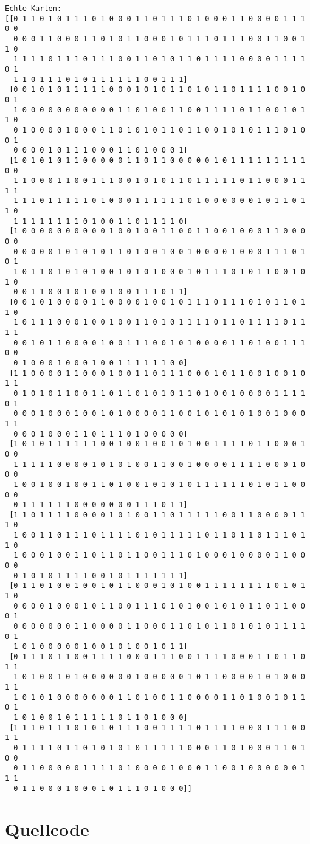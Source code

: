 \documentclass[a4paper,10pt,ngerman]{scrartcl}
\begin{document}
\begin{lstlisting}
Echte Karten: 
[[0 1 1 0 1 0 1 1 1 0 1 0 0 0 1 1 0 1 1 1 0 1 0 0 0 1 1 0 0 0 0 1 1 1 0 0
  0 0 0 1 1 0 0 0 1 1 0 1 0 1 1 0 0 0 1 0 1 1 1 0 1 1 1 0 0 1 1 0 0 1 1 0
  1 1 1 1 0 1 1 1 0 1 1 1 0 0 1 1 0 1 0 1 1 0 1 1 1 1 0 0 0 0 1 1 1 1 0 1
  1 1 0 1 1 1 0 1 0 1 1 1 1 1 1 0 0 1 1 1]
 [0 0 1 0 1 0 1 1 1 1 1 0 0 0 1 0 1 0 1 1 0 1 0 1 1 0 1 1 1 1 0 0 1 0 0 1
  1 0 0 0 0 0 0 0 0 0 0 0 1 1 0 1 0 0 1 1 0 0 1 1 1 1 0 1 1 0 0 1 0 1 1 0
  0 1 0 0 0 0 1 0 0 0 1 1 0 1 0 1 0 1 1 0 1 1 0 0 1 0 1 0 1 1 1 0 1 0 0 1
  0 0 0 0 1 0 1 1 1 0 0 0 1 1 0 1 0 0 0 1]
 [1 0 1 0 1 0 1 1 0 0 0 0 0 1 1 0 1 1 0 0 0 0 0 1 0 1 1 1 1 1 1 1 1 1 0 0
  1 1 0 0 0 1 1 0 0 1 1 1 0 0 1 0 1 0 1 1 0 1 1 1 1 1 0 1 1 0 0 0 1 1 1 1
  1 1 1 0 1 1 1 1 1 0 1 0 0 0 1 1 1 1 1 1 0 1 0 0 0 0 0 0 1 0 1 1 0 1 1 0
  1 1 1 1 1 1 1 1 0 1 0 0 1 1 0 1 1 1 1 0]
 [1 0 0 0 0 0 0 0 0 0 0 1 0 0 1 0 0 1 1 0 0 1 1 0 0 1 0 0 0 1 1 0 0 0 0 0
  0 0 0 0 0 1 0 1 0 1 0 1 1 0 1 0 0 1 0 0 1 0 0 0 0 1 0 0 0 1 1 1 0 1 0 1
  1 0 1 1 0 1 0 1 0 1 0 0 1 0 1 0 1 0 0 0 1 0 1 1 1 0 1 0 1 1 0 0 1 0 1 0
  0 0 1 1 0 0 1 0 1 0 0 1 0 0 1 1 1 0 1 1]
 [0 0 1 0 1 0 0 0 0 1 1 0 0 0 0 1 0 0 1 0 1 1 1 0 1 1 1 0 1 0 1 1 0 1 1 0
  1 0 1 1 1 0 0 0 1 0 0 1 0 0 1 1 0 1 0 1 1 1 1 0 1 1 0 1 1 1 1 0 1 1 1 1
  0 0 1 0 1 1 0 0 0 0 1 0 0 1 1 1 0 0 1 0 1 0 0 0 0 1 1 0 1 0 0 1 1 1 0 0
  0 1 0 0 0 1 0 0 0 1 0 0 1 1 1 1 1 1 0 0]
 [1 1 0 0 0 0 1 1 0 0 0 1 0 0 1 1 0 1 1 1 0 0 0 1 0 1 1 0 0 1 0 0 1 0 1 1
  0 1 0 1 0 1 1 0 0 1 1 0 1 1 0 1 0 1 0 1 1 0 1 0 0 1 0 0 0 0 1 1 1 1 0 1
  0 0 0 1 0 0 0 1 0 0 1 0 1 0 0 0 0 1 1 0 0 1 0 1 0 1 0 1 0 0 1 0 0 0 1 1
  0 0 0 1 0 0 0 1 1 0 1 1 1 0 1 0 0 0 0 0]
 [1 0 1 0 1 1 1 1 1 1 0 0 1 0 0 1 0 0 1 0 1 0 0 1 1 1 1 0 1 1 0 0 0 1 0 0
  1 1 1 1 1 0 0 0 0 1 0 1 0 1 0 0 1 1 0 0 1 0 0 0 0 1 1 1 1 0 0 0 1 0 0 0
  1 0 0 1 0 0 1 0 0 1 1 0 1 0 0 1 0 1 0 1 0 1 1 1 1 1 1 0 1 0 1 1 0 0 0 0
  0 1 1 1 1 1 1 0 0 0 0 0 0 0 1 1 1 0 1 1]
 [1 1 0 1 1 1 1 0 0 0 0 1 0 1 0 0 1 1 0 1 1 1 1 1 0 0 1 1 0 0 0 0 1 1 1 0
  1 0 0 1 1 0 1 1 1 0 1 1 1 1 0 1 0 1 1 1 1 1 0 1 1 0 1 1 0 1 1 1 0 1 1 0
  1 0 0 0 1 0 0 1 1 0 1 1 0 1 1 0 0 1 1 1 0 1 0 0 0 1 0 0 0 0 1 1 0 0 0 0
  0 1 0 1 0 1 1 1 1 0 0 1 0 1 1 1 1 1 1 1]
 [0 1 1 0 1 0 0 1 0 0 1 0 1 1 0 0 0 1 0 1 0 0 1 1 1 1 1 1 1 1 0 1 0 1 1 0
  0 0 0 0 1 0 0 0 1 0 1 1 0 0 1 1 1 0 1 0 1 0 0 1 0 1 0 1 1 0 1 1 0 0 0 1
  0 0 0 0 0 0 0 1 1 0 0 0 0 1 1 0 0 0 1 1 0 1 0 1 1 0 1 0 1 0 1 1 1 1 0 1
  1 0 1 0 0 0 0 0 1 0 0 1 0 1 0 0 1 0 1 1]
 [0 1 1 1 0 1 1 0 0 1 1 1 1 0 0 0 1 1 1 0 0 1 1 1 1 0 0 0 1 1 0 1 1 0 1 1
  1 0 1 0 0 1 0 1 0 0 0 0 0 0 1 0 0 0 0 0 1 0 1 1 0 0 0 0 1 0 1 0 0 0 1 1
  1 0 1 0 1 0 0 0 0 0 0 0 1 1 0 1 0 0 1 1 0 0 0 0 1 1 0 1 0 0 1 0 1 1 0 1
  1 0 1 0 0 1 0 1 1 1 1 1 0 1 1 0 1 0 0 0]
 [1 1 1 0 1 1 1 0 1 0 1 0 1 1 1 0 0 1 1 1 1 0 1 1 1 1 0 0 0 1 1 1 0 0 1 1
  0 1 1 1 1 0 1 1 0 1 0 1 0 1 0 1 1 1 1 1 0 0 0 1 1 0 1 0 0 0 1 1 0 1 0 0
  0 1 1 0 0 0 0 0 1 1 1 1 0 1 0 0 0 0 1 0 0 0 1 1 0 0 1 0 0 0 0 0 0 1 1 1
  0 1 1 0 0 0 1 0 0 0 1 0 1 1 1 0 1 0 0 0]]
\end{lstlisting}
\section{Quellcode}




\end{document}
